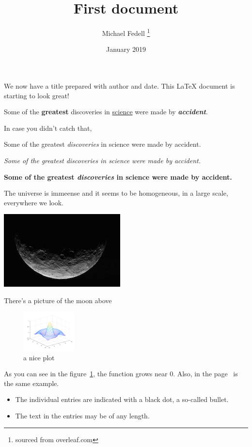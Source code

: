 \documentclass[12pt, letterpaper]{article}
\title{First document}
\author{Michael Fedell \thanks{sourced from overleaf.com}}
\date{January 2019}
\begin{document}
\maketitle
We now have a title prepared with author and date.
This \LaTeX{} document is starting to look great!

\newpage

Some of the \textbf{greatest}
discoveries in \underline{science}
were made by \textbf{\textit{accident}}.


In case you didn't catch that,

Some of the greatest \emph{discoveries}
in science
were made by accident.

\textit{Some of the greatest \emph{discoveries}
in science
were made by accident.}

\textbf{Some of the greatest \emph{discoveries}
in science
were made by accident.}

\newpage

The universe is immeense and it seems to be homogeneous, in a large scale, everywhere we look.

\includegraphics{moon}

There's a picture of the moon above

\newpage

\begin{figure}[h]
    \centering
    \includegraphics[width=0.25\textwidth]{mesh}
    \caption{a nice plot}
    \label{fig:mesh1}
\end{figure}

As you can see in the figure~\ref{fig:mesh1}, the
function grows near 0. Also, in the page~\pageref{fig:mesh1}
is the same example.

\newpage

\begin{itemize}
    \item The individual entries are indicated with a black dot, a so-called bullet.
    \item The text in the entries may be of any length.
\end{itemize}
\end{document}
